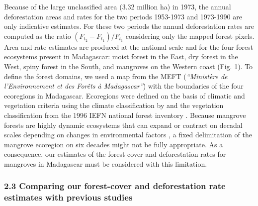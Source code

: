 \documentclass[]{article}
\begin{document}
Because of the large unclassified area (3.32 million ha) in 1973, the
annual deforestation areas and rates for the two periods 1953-1973 and
1973-1990 are only indicative estimates. For these two periods the
annual deforestation rates are computed as the ratio
\((F_{t_2}-F_{t_1})/F_{t_1}\) considering only the mapped forest pixels.
Area and rate estimates are produced at the national scale and for the
four forest ecosystems present in Madagascar: moist forest in the East,
dry forest in the West, spiny forest in the South, and mangroves on the
Western coast (Fig. 1). To define the forest domains, we used a map from
the MEFT (\emph{``Ministère de l'Environnement et des Forêts à
Madagascar''}) with the boundaries of the four ecoregions in Madagascar.
Ecoregions were defined on the basis of climatic and vegetation criteria
using the climate classification by \citet{Cornet1974} and the
vegetation classification from the 1996 IEFN national forest inventory
\citep{IEFN1996}. Because mangrove forests are highly dynamic ecosystems
that can expand or contract on decadal scales depending on changes in
environmental factors \citep{Armitage2015}, a fixed delimitation of the
mangrove ecoregion on six decades might not be fully appropriate. As a
consequence, our estimates of the forest-cover and deforestation rates
for mangroves in Madagascar must be considered with this limitation.

\hypertarget{comparing-our-forest-cover-and-deforestation-rate-estimates-with-previous-studies}{%
\subsubsection{2.3 Comparing our forest-cover and deforestation rate
estimates with previous
studies}\label{comparing-our-forest-cover-and-deforestation-rate-estimates-with-previous-studies}}
\end{document}
